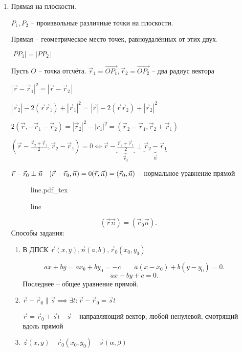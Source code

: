 \documentclass{book}
\theoremstyle{definition}
\newcommand\vect[1]{\overset{\longrightarrow}{#1}}
\newcommand{\incfig}[1]{%
    \def\svgwidth{\columnwidth}
    {#1.pdf_tex}
}
\begin{document}
 \begin{enumerate}
     \item Прямая на плоскости.

         $P_1, P_2$ -- произвольные различные точки на плоскости.

         Прямая -- геометрическое место точек, равноудалённых от этих двух.

         $\left| PP_1 \right|  = \left| PP_2 \right| $

         Пусть $O$ -- точка отсчёта.  $\vec r_1 = \vect{OP_1},\vec r_2 =  \vect{OP_2}$ -- два радиус вектора

         $\left| \vec r - \vec r_1 \right|^2 = \left| \vec r - \vec r_2 \right|  $

         $\left|\vec  r_2 \right| - 2\left( \vec r\vec r_1 \right) + \left| \vec r_1 \right| ^2 = \left| \vec r \right| -2\left( \vec r\vec r_2 \right) +\left| \vec r_2 \right| ^2$

         $2\left( \vec r,-\vec r_1-\vec r_2 \right) = \left| \vec r_2 \right| ^2-\left| r_1 \right| ^2 = \left( \vec r_2-\vec r_1, \vec r_2+\vec r_1 \right)  $

         $\left( \vec r - \frac{\vec r_2+\vec r_1}{2}, \vec r_2-\vec r_1 \right) =0 \iff \vec r - \underbrace{\frac{\vec r_2+\vec r_1}{2}}\limits_{\vec r_0} \perp \underbrace{\vec r_2-\vec r_1}\limits_{\vec n}$

         $\vec r-\vec r_0\perp \vec n\quad (\vec r-\vec r_0, \vec n) = 0\quad\\ (\vec r, \vec n) = (\vec r_0, \vec n)$ -- нормальное уравнение прямой
\begin{figure}[ht]
    \centering
    \incfig{line}
    \caption{line}
    \label{fig:line}
\end{figure}
 \[
     \left( \vec r\vec n \right) = \left( \vec r_0 \vec n \right)  
.\] 
Способы задания:
\begin{enumerate}
    \item В ДПСК $\vec r(x,y), \vec n(a,b),\vec r_0(x_0,y_0)$

         \[
             ax+by = ax_0+by_0 = -c \qquad a(x-x_0)+b(y-y_0) = 0
        .\] 
        \[
        ax+by+c=0
        .\]
        Последнее -- общее уравнение прямой.


    \item $\vec r-\vec r_0 \parallel \vec s \implies \exists t: \vec r-\vec r_0 = \vec s t$

        $\vec r = \vec r_0 + \vec st\quad\vec s$ -- направляющий вектор, любой ненулевой, смотрящий вдоль прямой
    \item $\vec z(x,y)\quad \vec r_0(x_0,y_0)\quad \vec s(\alpha, \beta)$


\end{enumerate}
\end{enumerate}
\end{document}
